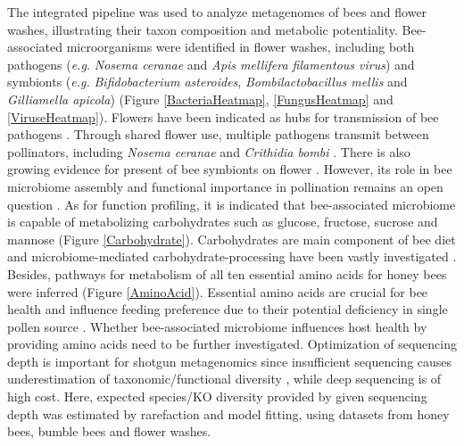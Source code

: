 \documentclass[11pt]{article}
\begin{document}
The integrated pipeline was used to analyze metagenomes of bees and flower washes, illustrating their taxon composition and metabolic potentiality. 
Bee-associated microorganisms were identified in flower washes, including both pathogens (\textit{e.g.} \textit{Nosema ceranae} and \textit{Apis mellifera filamentous virus}) and symbionts (\textit{e.g.} \textit{Bifidobacterium asteroides}, \textit{Bombilactobacillus mellis} and \textit{Gilliamella apicola}) (Figure \ref{BacteriaHeatmap}, \ref{FungusHeatmap} and \ref{ViruseHeatmap}). 
Flowers have been indicated as hubs for transmission of bee pathogens \cite{durrer1994shared,koch2017role}. 
Through shared flower use, multiple pathogens transmit between pollinators, including \textit{Nosema ceranae} \citep{furst2014disease} and \textit{Crithidia bombi} \citep{figueroa2019bee}. 
There is also growing evidence for present of bee symbionts on flower \citep{mcfrederick2012environment,mcfrederick2017flowers,keller2020more,vannette2020floral}.
However, its role in bee microbiome assembly and functional importance in pollination remains an open question \citep{keller2020more,vannette2020floral}. 
As for function profiling, it is indicated that bee-associated microbiome is capable of metabolizing carbohydrates such as glucose, fructose, sucrose and mannose (Figure \ref{Carbohydrate}). 
Carbohydrates are main component of bee diet and microbiome-mediated carbohydrate-processing have been vastly investigated \citep{engel2012functional,lee2015saccharide,lee2018differential,taylor2019effect}. 
Besides, pathways for metabolism of all ten essential amino acids for honey bees \citep{groot1953protein} were inferred (Figure \ref{AminoAcid}). 
Essential amino acids are crucial for bee health \citep{simcock2014single,paoli2014dietary,stabler2015nutrient,hendriksma2019effects} and influence feeding preference due to their potential deficiency in single pollen source \citep{cook2003honey,hendriksma2014amino,hendriksma2016honey}. 
Whether bee-associated microbiome influences host health by providing amino acids need to be further investigated. 
\newline
Optimization of sequencing depth is important for shotgun metagenomics since insufficient sequencing causes underestimation of taxonomic/functional diversity \citep{cattonaro2018you,zaheer2018impact,gweon2019impact,pereira2019impact}, while deep sequencing is of high cost. 
Here, expected species/KO diversity provided by given sequencing depth was estimated by rarefaction and model fitting, using datasets from honey bees, bumble bees and flower washes. 
\end{document}
